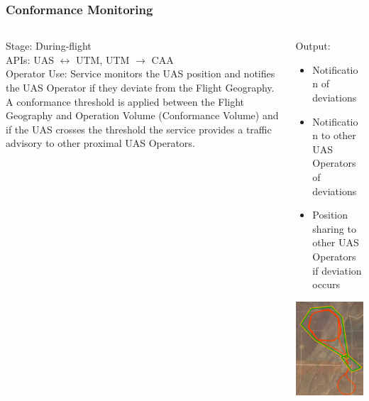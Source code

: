 \documentclass[usenames,dvipsnames,aspectratio=169,serif]{beamer}
\begin{document}
\begin{frame}
   \frametitle{Conformance Monitoring}
   \begin{columns}[t]
      \begin{column}{0.5\textwidth}
         Stage: During-flight \\
         APIs: UAS $\leftrightarrow$ UTM, UTM $\rightarrow$ CAA \\
         Operator Use: Service monitors the UAS position and notifies the UAS Operator if they deviate from the Flight Geography. A conformance threshold is applied between the Flight Geography and Operation Volume (Conformance Volume) and if the UAS crosses the threshold the service provides a traffic advisory to other proximal UAS Operators.
      \end{column}
      \begin{column}{0.5\textwidth}
         Output:
         \begin{itemize}\small
         \item  Notification of deviations
         \item  Notification to other UAS Operators of deviations
         \item  Position sharing to other UAS Operators if deviation occurs
         \end{itemize}
         \includegraphics[height=0.45\textwidth]{img/conformance-monitoring.png}

      \end{column}
   \end{columns}
\end{frame}
\end{document}

